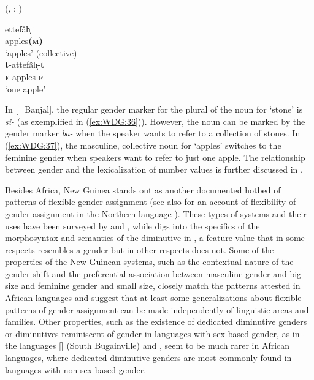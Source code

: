 \documentclass[output=collectionpaper]{langsci/langscibook}
\begin{document}
\ea\label{ex:WDG:37}
 (, ; \citealt[32]{Beguinot1942}) \\
\begin{xlist}
\ex
\gll	ettefâh̩ \\
	apples\textbf{(\textsc{m})} \\
\glt	`apples' (collective) \\
\ex
\gll 	\textbf{t}-attefâh̩-\textbf{t} \\
	\textbf{\textsc{f}}-apples-\textbf{\textsc{f}} \\
\glt	`one apple' \\
\end{xlist}
\z

In  [=Banjal], the regular gender marker for the plural of the noun for `stone' is \textit{si-} (as exemplified in (\ref{ex:WDG:36})). However, the noun can be marked by the gender marker \textit{ba-} when the speaker wants to refer to a collection of stones. In  (\ref{ex:WDG:37}), the masculine, collective noun for `apples' switches to the feminine gender when speakers want to refer to just one apple. The relationship between gender and the lexicalization of number values is further discussed in .

Besides Africa, New Guinea stands out as another documented hotbed of patterns of flexible gender assignment (see also \citealt{Singer2018} for an account of flexibility of gender assignment in the Northern  language ). These types of systems and their uses have been surveyed by \cite{Aikhenvald2012} and , while  digs into the specifics of the morphosyntax and semantics of the diminutive in , a feature value that in some respects resembles a gender but in other respects does not. Some of the properties of the New Guinean systems, such as the contextual nature of the gender shift and the preferential association between masculine gender and big size and feminine gender and small size, closely match the patterns attested in African languages and suggest that at least some generalizations about flexible patterns of gender assignment can be made independently of linguistic areas and families. Other properties, such as the existence of dedicated diminutive genders or diminutives reminiscent of gender in languages with sex-based gender, as in the  languages  [] (South Bugainville) and , seem to be much rarer in African languages, where dedicated diminutive genders are most commonly found in languages with non-sex based gender.
\end{document}
